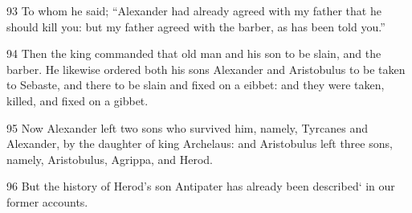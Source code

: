 93 To whom he said; “Alexander had already agreed with my father that he should kill you: but my father agreed with the barber, as has been told you.” 

94 Then the king commanded that old man and his son to be slain, and the barber. He likewise ordered both his sons Alexander and Aristobulus to be taken to Sebaste, and there to be slain and fixed on a eibbet: and they were taken, killed, and fixed on a gibbet.

95 Now Alexander left two sons who survived him, namely, Tyrcanes and Alexander, by the daughter of king Archelaus: and Aristobulus left three sons, namely, Aristobulus, Agrippa, and Herod. 

96 But the history of Herod’s son Antipater has already been described‘ in our former accounts.


